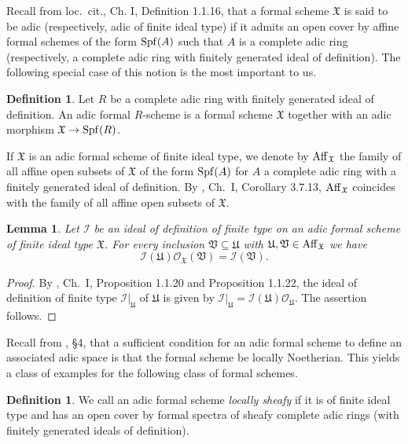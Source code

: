 \documentclass[12pt,twoside,a4paper]{article}
\newtheorem{lemma}[thm]{Lemma}
\theoremstyle{definition}
\newtheorem{mydef}[thm]{Definition}
\theoremstyle{remark}
\newcommand\Aff{{\rm Aff}}
\newcommand\Spf{{\rm Spf}}
\begin{document}
Recall from loc.~cit., Ch. I, Definition 1.1.16, that a formal scheme $\mathfrak{X}$ is said to be adic (respectively, adic of finite ideal type) if it admits an open cover by affine formal schemes of the form $\Spf(A)$ such that $A$ is a complete adic ring (respectively, a complete adic ring with finitely generated ideal of definition). The following special case of this notion is the most important to us. 
\begin{mydef}\label{Adic formal scheme}Let $R$ be a complete adic ring with finitely generated ideal of definition. An adic formal $R$-scheme is a formal scheme $\mathfrak{X}$ together with an adic morphism $\mathfrak{X}\to \Spf(R)$.\end{mydef}
If $\mathfrak{X}$ is an adic formal scheme of finite ideal type, we denote by $\Aff_{\mathfrak{X}}$ the family of all affine open subsets of $\mathfrak{X}$ of the form $\Spf(A)$ for $A$ a complete adic ring with a finitely generated ideal of definition. By \cite{FK}, Ch.~I, Corollary 3.7.13, $\Aff_{\mathfrak{X}}$ coincides with the family of all affine open subsets of $\mathfrak{X}$.
\begin{lemma}\label{Restriction maps are submetric}Let $\mathcal{I}$ be an ideal of definition of finite type on an adic formal scheme of finite ideal type $\mathfrak{X}$. For every inclusion $\mathfrak{V}\subseteq\mathfrak{U}$ with $\mathfrak{U}, \mathfrak{V}\in\Aff_{\mathfrak{X}}$ we have \begin{equation*}\mathcal{I}(\mathfrak{U})\mathcal{O}_{\mathfrak{X}}(\mathfrak{V})=\mathcal{I}(\mathfrak{V}).\end{equation*}\end{lemma}
\begin{proof}By \cite{FK}, Ch.~I, Proposition 1.1.20 and Proposition 1.1.22, the ideal of definition of finite type $\mathcal{I}\vert_{\mathfrak{U}}$ of $\mathfrak{U}$ is given by $\mathcal{I}\vert_{\mathfrak{U}}=\mathcal{I}(\mathfrak{U})\mathcal{O}_{\mathfrak{U}}$. The assertion follows.\end{proof}  
Recall from \cite{Huber2}, \S4, that a sufficient condition for an adic formal scheme to define an associated adic space is that the formal scheme be locally Noetherian. This yields a class of examples for the following class of formal schemes.
\begin{mydef}We call an adic formal scheme \textit{locally sheafy} if it is of finite ideal type and has an open cover by formal spectra of sheafy complete adic rings (with finitely generated ideals of definition).\end{mydef}
\end{document}
